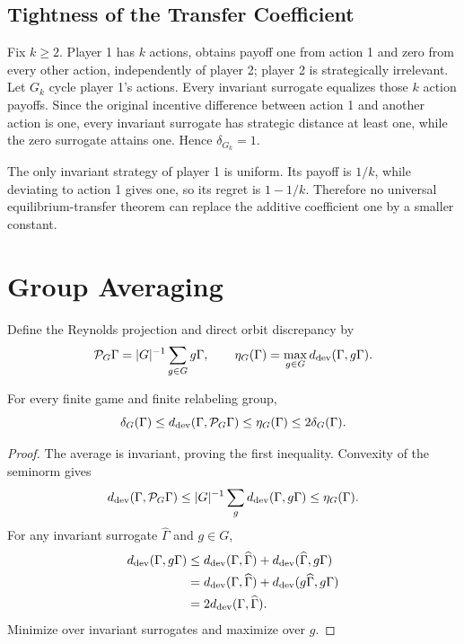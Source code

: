 \subsection{Tightness of the Transfer Coefficient}

Fix $k\ge2$.  Player 1 has $k$ actions, obtains payoff one from action 1 and zero from every other action, independently of player 2; player 2 is strategically irrelevant.  Let $G_k$ cycle player 1's actions.  Every invariant surrogate equalizes those $k$ action payoffs.  Since the original incentive difference between action 1 and another action is one, every invariant surrogate has strategic distance at least one, while the zero surrogate attains one.  Hence $\delta_{G_k}=1$.

The only invariant strategy of player 1 is uniform.  Its payoff is $1/k$, while deviating to action 1 gives one, so its regret is $1-1/k$.  Therefore no universal equilibrium-transfer theorem can replace the additive coefficient one by a smaller constant.

\section{Group Averaging}

Define the Reynolds projection and direct orbit discrepancy by
\[
\mathcal P_G\Gamma=|G|^{-1}\sum_{g\in G}g\Gamma,
\qquad
\eta_G(\Gamma)=\max_{g\in G}d_{\mathrm{dev}}(\Gamma,g\Gamma).
\]

\begin{theorem}
\label{thm:supp-reynolds}
For every finite game and finite relabeling group,
\[
\delta_G(\Gamma)
\le
d_{\mathrm{dev}}(\Gamma,\mathcal P_G\Gamma)
\le
\eta_G(\Gamma)
\le
2\delta_G(\Gamma).
\]
\end{theorem}
\begin{proof}
The average is invariant, proving the first inequality.  Convexity of the seminorm gives
\[
d_{\mathrm{dev}}(\Gamma,\mathcal P_G\Gamma)
\le
|G|^{-1}\sum_gd_{\mathrm{dev}}(\Gamma,g\Gamma)
\le\eta_G(\Gamma).
\]
For any invariant surrogate $\widehat\Gamma$ and $g\in G$,
\begin{align*}
d_{\mathrm{dev}}(\Gamma,g\Gamma)
&\le
d_{\mathrm{dev}}(\Gamma,\widehat\Gamma)
+
d_{\mathrm{dev}}(\widehat\Gamma,g\Gamma)\\
&=
d_{\mathrm{dev}}(\Gamma,\widehat\Gamma)
+
d_{\mathrm{dev}}(g\widehat\Gamma,g\Gamma)\\
&=2d_{\mathrm{dev}}(\Gamma,\widehat\Gamma).
\end{align*}
Minimize over invariant surrogates and maximize over $g$.
\end{proof}

